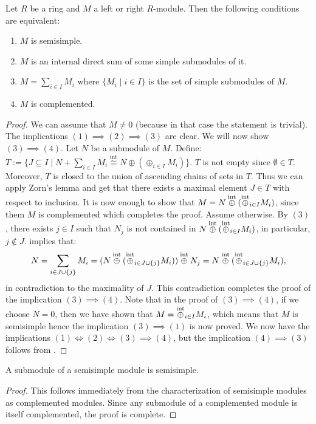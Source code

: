 \documentclass[11pt,a4paper]{article}
\begin{document}
\begin{theorem}
  Let $R$ be a ring and $M$ a left or right $R$-module.
  Then the following conditions are equivalent:
  \begin{enumerate}
    \item[(1)] $M$ is semisimple.
    \item[(2)] $M$ is an internal direct sum of some simple submodules of it.
    \item[(3)] $M = \sum_{i \in I} M_i$ where $\{M_i \mid i \in I\}$
      is the set of simple submodules of $M$.
    \item[(4)] $M$ is complemented.
  \end{enumerate}
\end{theorem}
\begin{proof}
  We can assume that $M \neq 0$ (because in that case the statement is trivial).
  The implications $(1) \implies (2) \implies (3)$ are clear.
  We will now show $(3) \implies (4)$.
  Let $N$ be a submodule of $M$.
  Define:
    $T := \{J \subseteq I \mid
      N + \sum_{i \in I} M_i \overset{\text{int}}{\cong}
      N \oplus (\oplus_{i \in I} M_i)\}$.
  $T$ is not empty since $\emptyset \in T$.
  Moreover, $T$ is closed to the union of ascending chains of sets in $T$.
  Thus we can apply Zorn's lemma and get that there exists a maximal
  element $J \in T$ with respect to inclusion.
  It is now enough to show that $M = N \overset{\text{int}}{\oplus} (\overset{\text{int}}{\oplus}_{i \in I} M_i)$,
  since them $M$ is complemented which completes the proof.
  Assume otherwise.
  By $(3)$, there exists $j \in I$ such that $N_j$ is not contained in
  $N \overset{\text{int}}{\oplus} (\overset{\text{int}}{\oplus}_{i \in I} M_i)$,
  in particular, $j \notin J$.
   implies that:
  \[
    N = \sum_{i \in J \cup \left\{j\right\}} M_i =
    (N \overset{\text{int}}{\oplus} (\overset{\text{int}}{\oplus}_{i \in J \cup \left\{j\right\}} M_i)) \overset{\text{int}}{\oplus} N_j =
    N \overset{\text{int}}{\oplus} (\overset{\text{int}}{\oplus}_{i \in J \cup \left\{j\right\}} M_i),
  \]
  in contradiction to the maximality of $J$.
  This contradiction completes the proof of the implication $(3) \implies (4)$.
  Note that in the proof of $(3) \implies (4)$, if we choose $N = 0$,
  then we have shown that $M = \overset{\text{int}}{\oplus}_{i \in I} M_i$,
  which means that $M$ is semisimple hence the implication $(3) \implies (1)$
  is now proved.
  We now have the implications $(1) \iff (2) \iff (3) \implies (4)$,
  but the implication $(4) \implies (3)$ follows from
  .
\end{proof}

\begin{corollary}
  A submodule of a semisimple module is semisimple.
\end{corollary}
\begin{proof}
  This follows immediately from the characterization of semisimple modules as
  complemented modules.
  Since any submodule of a complemented module is itself complemented,
  the proof is complete.
\end{proof}
\end{document}
